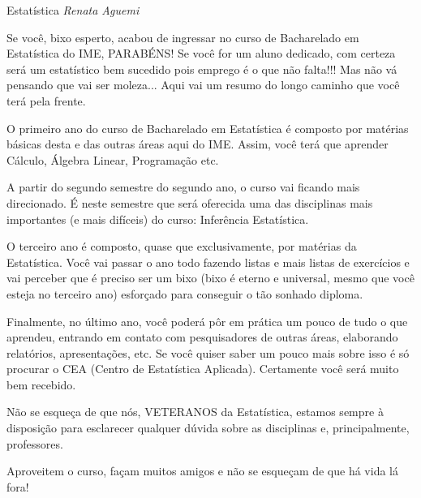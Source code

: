 \begin{subsecao}{Estatística}
{\em Renata Aguemi}

Se você, bixo esperto, acabou de ingressar no curso de Bacharelado em
Estatística do IME, PARABÉNS! Se você for um aluno dedicado, com certeza será
um estatístico bem sucedido pois emprego é o que não falta!!! Mas não vá
pensando que vai ser moleza... Aqui vai um resumo do longo caminho que você
terá pela frente.

O primeiro ano do curso de Bacharelado em Estatística é composto por matérias
básicas desta e das outras áreas aqui do IME. Assim, você terá que aprender
Cálculo, Álgebra Linear, Programação etc.

A partir do segundo semestre do segundo ano, o curso vai ficando mais
direcionado. É neste semestre que será oferecida uma das disciplinas mais
importantes (e mais difíceis) do curso: Inferência Estatística.

O terceiro ano é composto, quase que exclusivamente, por matérias da
Estatística. Você vai passar o ano todo fazendo listas e mais listas de
exercícios e vai perceber que é preciso ser um bixo (bixo é eterno e universal,
mesmo que você esteja no terceiro ano) esforçado para conseguir o tão sonhado
diploma.

Finalmente, no último ano, você poderá pôr em prática um pouco de tudo o que
aprendeu, entrando em contato com pesquisadores de outras áreas, elaborando
relatórios, apresentações, etc. Se você quiser saber um pouco mais sobre isso é
só procurar o CEA (Centro de Estatística Aplicada). Certamente você será muito
bem recebido.

Não se esqueça de que nós, VETERANOS da Estatística, estamos sempre à
disposição para esclarecer qualquer dúvida sobre as disciplinas e,
principalmente, professores.

Aproveitem o curso, façam muitos amigos e não se esqueçam de que há vida lá fora!

\end{subsecao}
